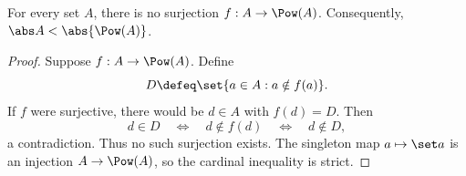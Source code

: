 \begin{theorem}[Cantor]
For every set \(A\), there is no surjection \(f:A\to\Pow(A)\).  Consequently,
\(\abs A<\abs{\Pow(A)}\).
\end{theorem}
\begin{proof}
Suppose \(f:A\to\Pow(A)\).  Define
\[
  D\defeq\set{a\in A:a\notin f(a)}.
\]
If \(f\) were surjective, there would be \(d\in A\) with \(f(d)=D\).  Then
\[
  d\in D\quad\Longleftrightarrow\quad d\notin f(d)
  \quad\Longleftrightarrow\quad d\notin D,
\]
a contradiction.  Thus no such surjection exists.  The singleton map
\(a\mapsto\set a\) is an injection \(A\to\Pow(A)\), so the cardinal inequality
is strict.
\end{proof}


